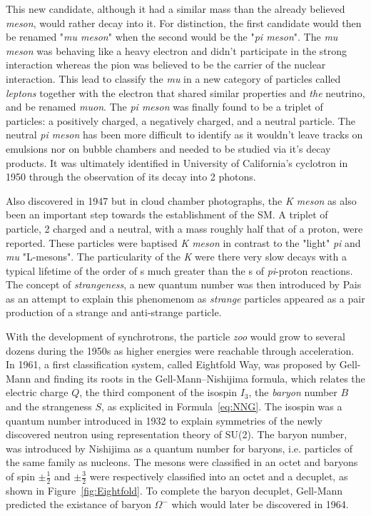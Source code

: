 	This new candidate, although it had a similar mass than the already believed \textit{meson}, would rather decay into it. For distinction, the first candidate would then be renamed "\textit{mu meson}" when the second would be the "\textit{pi meson}". The \textit{mu meson} was behaving like a heavy electron and didn't participate in the strong interaction whereas the pion was believed to be the carrier of the nuclear interaction. This lead to classify the \textit{mu} in a new category of particles called \textit{leptons} together with the electron that shared similar properties and \textit{the} neutrino, and be renamed \textit{muon}. The \textit{pi meson} was finally found to be a triplet of particles: a positively charged, a negatively charged, and a neutral particle. The neutral \textit{pi meson} has been more difficult to identify as it wouldn't leave tracks on emulsions nor on bubble chambers and needed to be studied via it's decay products. It was ultimately identified in University of California's cyclotron in 1950 through the observation of its decay into 2 photons.
	
	Also discovered in 1947 but in cloud chamber photographs, the \textit{K meson} as also been an important step towards the establishment of the \acl{SM}. A triplet of particle, 2 charged and a neutral, with a mass roughly half that of a proton, were reported. These particles were baptised \textit{K meson} in contrast to the "light" \textit{pi} and \textit{mu} "L-mesons". The particularity of the \textit{K} were there very slow decays with a typical lifetime of the order of \si{s} much greater than the \si{s} of \textit{pi}-proton reactions. The concept of \textit{strangeness}, a new quantum number was then introduced by Pais as an attempt to explain this phenomenom as \textit{strange} particles appeared as a pair production of a strange and anti-strange particle.
	
	With the development of synchrotrons, the particle \textit{zoo} would grow to several dozens during the 1950s as higher energies were reachable through acceleration. In 1961, a first classification system, called Eightfold Way, was proposed by Gell-Mann and finding its roots in the Gell-Mann--Nishijima formula, which relates the electric charge $Q$, the third component of the isospin $I_3$, the \textit{baryon} number $B$ and the strangeness $S$, as explicited in Formula~\ref{eq:NNG}. The isospin was a quantum number introduced in 1932 to explain symmetries of the newly discovered neutron using representation theory of SU(2). The baryon number, was introduced by Nishijima as a quantum number for baryons, i.e. particles of the same family as nucleons. The mesons were classified in an octet and baryons of spin $\pm\frac{1}{2}$ and $\pm\frac{3}{2}$ were respectively classified into an octet and a decuplet, as shown in Figure~\ref{fig:Eightfold}. To complete the baryon decuplet, Gell-Mann predicted the existance of baryon $\Omega^-$ which would later be discovered in 1964.
	

